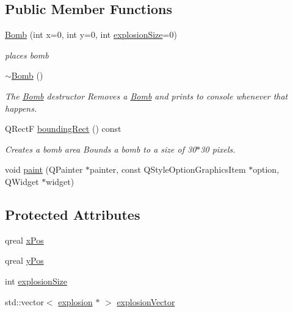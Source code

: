 \subsection*{Public Member Functions}
\begin{DoxyCompactItemize}
\item 
\hyperlink{class_bomb_ada9d05fb30c035691190e80d1d0a1c7f}{Bomb} (int x=0, int y=0, int \hyperlink{class_bomb_a7576bf99d4bcfbc7dda365511ca2fcd7}{explosion\-Size}=0)
\begin{DoxyCompactList}\small\item\em places bomb \end{DoxyCompactList}\item 
\hyperlink{class_bomb_acbb47327cfb2fa429887774ef3597965}{$\sim$\-Bomb} ()
\begin{DoxyCompactList}\small\item\em The \hyperlink{class_bomb}{Bomb} destructor Removes a \hyperlink{class_bomb}{Bomb} and prints to console whenever that happens. \end{DoxyCompactList}\item 
Q\-Rect\-F \hyperlink{class_bomb_ad047941e8f1413a061f98f460dcea22a}{bounding\-Rect} () const 
\begin{DoxyCompactList}\small\item\em Creates a bomb area Bounds a bomb to a size of 30$\ast$30 pixels. \end{DoxyCompactList}\item 
void \hyperlink{class_bomb_ab8e930cc66f5d3f41e8a02f3d0d8185e}{paint} (Q\-Painter $\ast$painter, const Q\-Style\-Option\-Graphics\-Item $\ast$option, Q\-Widget $\ast$widget)
\end{DoxyCompactItemize}
\subsection*{Protected Attributes}
\begin{DoxyCompactItemize}
\item 
qreal \hyperlink{class_bomb_ac2068167b771ed338aa17c99524b8131}{x\-Pos}
\item 
qreal \hyperlink{class_bomb_a0d1028a49b33b08f5c96a943fab0beff}{y\-Pos}
\item 
int \hyperlink{class_bomb_a7576bf99d4bcfbc7dda365511ca2fcd7}{explosion\-Size}
\item 
std\-::vector$<$ \hyperlink{classexplosion}{explosion} $\ast$ $>$ \hyperlink{class_bomb_a03d27f3d615aba4b77f83427912a7de6}{explosion\-Vector}
\end{DoxyCompactItemize}


